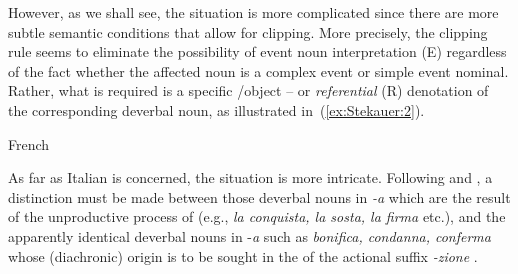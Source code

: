 \documentclass[output=paper]{langsci/langscibook}
\begin{document}
However, as we shall see, the situation is more complicated since there
are more subtle semantic conditions that allow for clipping. More
precisely, the clipping rule seems to eliminate the possibility of event
noun interpretation (E) regardless of the fact whether the affected noun
is a complex event or simple event nominal. Rather, what is required is
a specific /object -- or \emph{referential} (R) denotation of the
corresponding deverbal noun, as illustrated in~(\ref{ex:Stekauer:2}).

\begin{exe}

\ex\label{ex:Stekauer:2} French
\begin{xlist}
\end{xlist}
 \end{exe}

As far as Italian is concerned, the situation is more intricate.
Following %
\citet{Thornton2004} %
%
and %
\citet{MonterminiThornton2014}%
%
, a
distinction must be made between those deverbal nouns in \emph{-a} which
are the result of the unproductive process of  (e.g., \emph{la
conquista, la sosta, la firma} etc.), and the apparently identical
deverbal nouns in -\emph{a} such as \emph{bonifica, condanna, conferma}
whose (diachronic) origin is to be sought in the  of the
actional suffix \emph{-zione}   %
\citep[see][187 ff.]{MonterminiThornton2014}%
%
.
\end{document}
